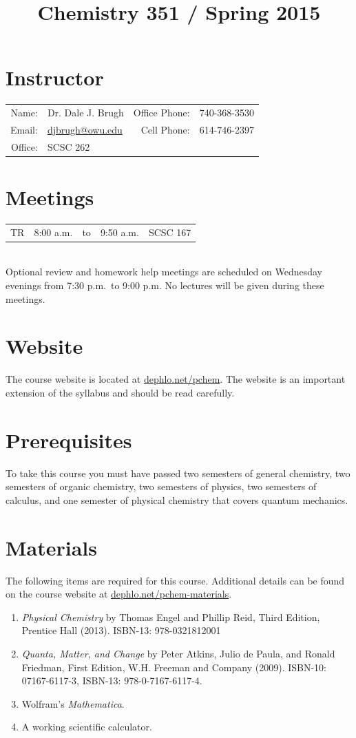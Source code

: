 \documentclass[letterpaper,oneside,onecolumn,11pt,article]{memoir}
\title{Chemistry 351 / Spring 2015}
\date{}
\author{}
\begin{document}
\maketitle
\thispagestyle{courseinformationtitle}
%
%
\section{Instructor}
\begin{tabular}{rl|rl}
Name: & Dr. Dale J. Brugh & Office Phone: & 740-368-3530 \\
Email: & \href{mailto:djbrugh@owu.edu}{djbrugh@owu.edu} & Cell Phone: & 614-746-2397 \\
Office: & SCSC 262 & &  \\
\end{tabular}
%
%
\section{Meetings}
\begin{tabular}{crcrl}
TR & 8:00 a.m. & to & 9:50 a.m. & SCSC 167\\
\end{tabular} \\[0.09in]
Optional review and homework help meetings are scheduled on Wednesday evenings from 7:30 p.m.\ to 9:00 p.m. No lectures will be given during these meetings. 
%
%
\section{Website}
The course website is located at \href{http://dephlo.net/pchem}{dephlo.net/pchem}. The website is an important extension of the syllabus and should be read carefully.
%
%
\section{Prerequisites}
To take this course you must have passed two semesters of general chemistry, two semesters of organic chemistry, two semesters of physics, two semesters of calculus, and one semester of physical chemistry that covers quantum mechanics.
%
%
\section{Materials}
The following items are required for this course. Additional details can be found on the course website at \href{http://dephlo.net/pchem-materials}{dephlo.net/pchem-materials}.
\begin{enumerate}
\item \emph{Physical Chemistry} by Thomas Engel and Phillip Reid, Third Edition, Prentice Hall (2013).  ISBN-13: 978-0321812001
\item \emph{Quanta, Matter, and Change} by Peter Atkins, Julio de Paula, and Ronald Friedman, First Edition, W.H. Freeman and Company (2009). ISBN-10: 07167-6117-3, ISBN-13: 978-0-7167-6117-4.
\item Wolfram's \emph{Mathematica}.
\item A working scientific calculator.
\end{enumerate}
%
%
\end{document}

